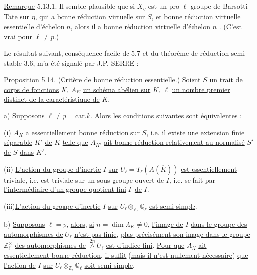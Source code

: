 \underline{Remarque} 5.13.1. Il semble plausible que si $X_\eta$ est un pro-$\ell$-groupe de Barsotti-Tate sur $\eta$, qui a bonne réduction virtuelle sur $S$, et bonne réduction virtuelle essentielle d'échelon $n$, alors il a bonne réduction virtuelle d'échelon $n$ . (C'est vrai pour $\ell \neq p$.)



Le résultat suivant, conséquence facile de 5.7 et du théorème de réduction semi-stable 3.6, m'a été signalé par J.P. SERRE :

\underline{Proposition} 5.14. (\underline{Critère de bonne réduction essentielle.}) \underline{Soient} $S$ \underline{un trait de corps de fonctions} $K$, $A_K$ \underline{un schéma abélien sur} $K$, $\ell$ \underline{un nombre premier distinct de la caractéristique de} $K$.

a) \underline{Supposons} $\ell \neq p = \mathrm{car}.k.$ \underline{Alors les conditions suivantes sont équivalentes} :

(i) $A_K$ \underline{a} essentiellement bonne réduction \underline{sur} $S$, \underline{i.e.} \underline{il existe une extension finie séparable} $K'$ \underline{de} $K$ \underline{telle que} $A_{K'}$ \underline{ait bonne réduction relativement au normalisé} $S'$ \underline{de} $S$ \underline{dans} $K'$.

(ii) \underline{L'action du groupe d'inertie} $I$ \underline{sur} $U_\ell = T_\ell(A(\overline{K}))$ \underline{est essentiellement triviale}, \underline{i.e.} \underline{est triviale sur un sous-groupe ouvert de} $I$, \underline{i.e.} \underline{se fait par l'intermédiaire d'un groupe quotient fini} $\Gamma$ \underline{de} $I$.

(iii)\underline{L'action du groupe d'inertie} $I$ \underline{sur} $U_\ell \otimes_{\mathbb{Z}_\ell} \mathbb{Q}_\ell$ \underline{est semi-simple}.

b) \underline{Supposons} $\ell = p$, \underline{alors}, \underline{si} $n = \dim A_K \neq 0$, \underline{l'image de} $I$ \underline{dans le groupe des automorphismes de} $U_\ell$ \underline{n'est pas finie}, \underline{plus précisément son image dans le groupe} $\mathbb{Z}_\ell^{\times}$ \underline{des automorphismes de} $\stackrel{2n}{\wedge} U_\ell$ \underline{est d'indice fini}. \underline{Pour que} $A_K$ \underline{ait essentiellement bonne réduction}, \underline{il suffit} (\underline{mais il n'est nullement nécessaire}) \underline{que l'action de} $I$ \underline{sur} $U_\ell \otimes_{\mathbb{Z}_\ell} \mathbb{Q}_\ell$ \underline{soit semi-simple}.

